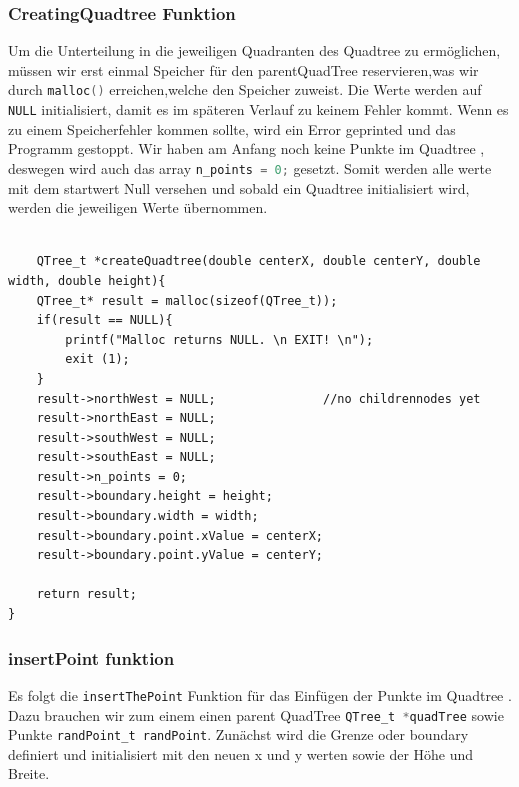 \documentclass[11pt]{article}
\newcommand{\qt}{Quadtree }
\newcommand{\lstin}[1]{\lstinline[language=C]{#1}}
\begin{document}
\subsubsection{CreatingQuadtree Funktion}
Um die Unterteilung in die jeweiligen Quadranten des \qt zu ermöglichen, müssen wir erst einmal Speicher für den parentQuadTree reservieren,was wir durch \lstin{malloc()} erreichen,welche den Speicher zuweist. 
Die Werte werden auf \lstin{NULL} initialisiert, damit es im späteren Verlauf zu keinem Fehler kommt. 
Wenn es zu einem Speicherfehler kommen sollte, wird ein Error geprinted und das Programm gestoppt. 
Wir haben am Anfang noch keine Punkte im \qt, deswegen wird auch das array \lstin{n_points = 0;} gesetzt. 
Somit werden alle werte mit dem startwert Null versehen und sobald ein \qt initialisiert wird, werden die jeweiligen Werte übernommen.

\begin{lstlisting}

    QTree_t *createQuadtree(double centerX, double centerY, double width, double height){
    QTree_t* result = malloc(sizeof(QTree_t));
    if(result == NULL){
        printf("Malloc returns NULL. \n EXIT! \n");
        exit (1); 
    }
    result->northWest = NULL;               //no childrennodes yet 
    result->northEast = NULL; 
    result->southWest = NULL; 
    result->southEast = NULL;
    result->n_points = 0; 
    result->boundary.height = height; 
    result->boundary.width = width; 
    result->boundary.point.xValue = centerX; 
    result->boundary.point.yValue = centerY; 

    return result; 
}
\end{lstlisting}

\subsubsection{insertPoint funktion}

Es folgt die \lstin{insertThePoint} Funktion für das Einfügen der Punkte im \qt. Dazu brauchen wir zum einem einen parent QuadTree \lstin{QTree_t *quadTree} sowie Punkte \lstin{randPoint_t randPoint}.\newline
Zunächst wird die Grenze oder boundary definiert und initialisiert mit den neuen x und y werten sowie der Höhe und Breite.
\end{document}
